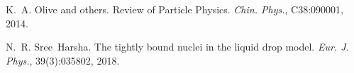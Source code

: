 
\begin{DoxyDescription}
\item[\label{citelist_CITEREF_PDGlist}%
\Hypertarget{citelist_CITEREF_PDGlist}%
\mbox{[}1\mbox{]}]K.~A. Olive and others. Review of Particle Physics. {\itshape Chin. Phys.}, C38\+:090001, 2014. 


\item[\label{citelist_CITEREF_Harsha:2017qym}%
\Hypertarget{citelist_CITEREF_Harsha:2017qym}%
\mbox{[}2\mbox{]}]N.~R. Sree~Harsha. The tightly bound nuclei in the liquid drop model. {\itshape Eur. J. Phys.}, 39(3)\+:035802, 2018. 


\end{DoxyDescription}